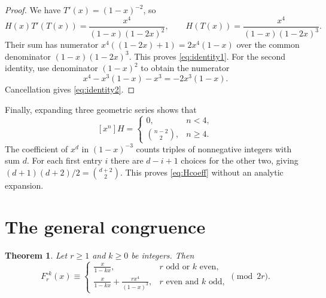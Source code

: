 \documentclass[11pt,a4paper]{article}
\newtheorem{theorem}{Theorem}[section]
\theoremstyle{remark}
\newcommand{\coeff}[2]{[x^{#1}]#2}
\begin{document}
\begin{proof}
We have $T'(x)=(1-x)^{-2}$, so
\[
H(x)T'(T(x))=\frac{x^4}{(1-x)(1-2x)^2},\qquad
H(T(x))=\frac{x^4}{(1-x)(1-2x)^3}.
\]
Their sum has numerator $x^4((1-2x)+1)=2x^4(1-x)$ over the
common denominator $(1-x)(1-2x)^3$. This proves
\eqref{eq:identity1}. For the second identity, use denominator
$(1-x)^2$ to obtain the numerator
\[
x^4-x^3(1-x)-x^3=-2x^3(1-x).
\]
Cancellation gives \eqref{eq:identity2}.
\end{proof}

Finally, expanding three geometric series shows that
\begin{equation}\label{eq:Hcoeff}
\coeff{n}{H}=
\begin{cases}
0,&n<4,\\
\binom{n-2}{2},&n\ge4.
\end{cases}
\end{equation}
The coefficient of $x^d$ in $(1-x)^{-3}$ counts triples of
nonnegative integers with sum $d$. For each first entry $i$ there
are $d-i+1$ choices for the other two, giving
$(d+1)(d+2)/2=\binom{d+2}{2}$. This proves
\eqref{eq:Hcoeff} without an analytic expansion.

\section{The general congruence}

\begin{theorem}\label{thm:general}
Let $r\ge1$ and $k\ge0$ be integers. Then
\begin{equation}\label{eq:general-congruence}
F_r^{\circ k}(x)\equiv
\begin{cases}
\displaystyle\frac{x}{1-kx},&r\text{ odd or }k\text{ even},\\[7pt]
\displaystyle\frac{x}{1-kx}+\frac{rx^4}{(1-x)^3},
&r\text{ even and }k\text{ odd},
\end{cases}
\pmod{2r}.
\end{equation}
\end{theorem}
\end{document}
